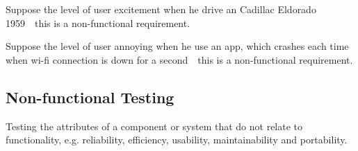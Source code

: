 Suppose the level of user excitement when he drive an Cadillac Eldorado 1959~\textemdash~this is a non-functional requirement.

Suppose the level of user annoying when he use an app, which crashes each time when wi-fi connection is down for a second~\textemdash~this is a non-functional requirement.

\subsection{Non-functional Testing}
\label{sec:Non-functional Testing}

Testing the attributes of a component or system that do not relate to functionality, e.g. reliability, efficiency, usability, maintainability and portability.
